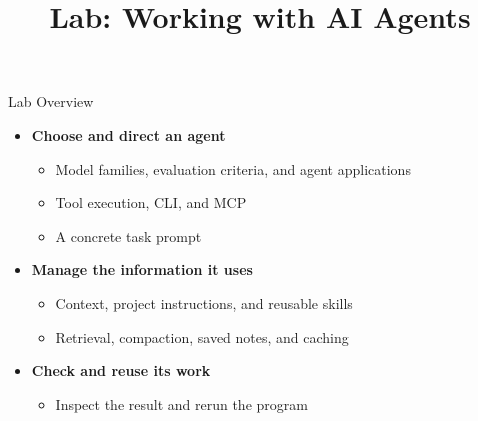 \newcommand{\CourseTemplatePath}{../../../../../templates/slides/}

\title[Working with AI Agents]{Lab: Working with AI Agents}
\newif\ifShowExtendedAIContent
\ShowExtendedAIContentfalse

\makecoursetitle

\ifShowExtendedAIContent
\begin{frame}{Lab Overview}

\begin{itemize}
\item \textbf{Choose and direct an agent}
  \begin{itemize}
  \item Model families, evaluation criteria, and agent applications
  \item Tool execution, CLI, and MCP
  \item A concrete task prompt
  \end{itemize}
\item \textbf{Manage the information it uses}
  \begin{itemize}
  \item Context, project instructions, and reusable skills
  \item Retrieval, compaction, saved notes, and caching
  \end{itemize}
\item \textbf{Check and reuse its work}
  \begin{itemize}
  \item Inspect the result and rerun the program
  \end{itemize}
\end{itemize}
\end{frame}
\else
